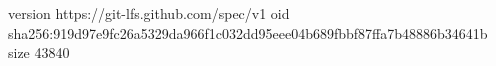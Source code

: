 version https://git-lfs.github.com/spec/v1
oid sha256:919d97e9fc26a5329da966f1c032dd95eee04b689fbbf87ffa7b48886b34641b
size 43840
